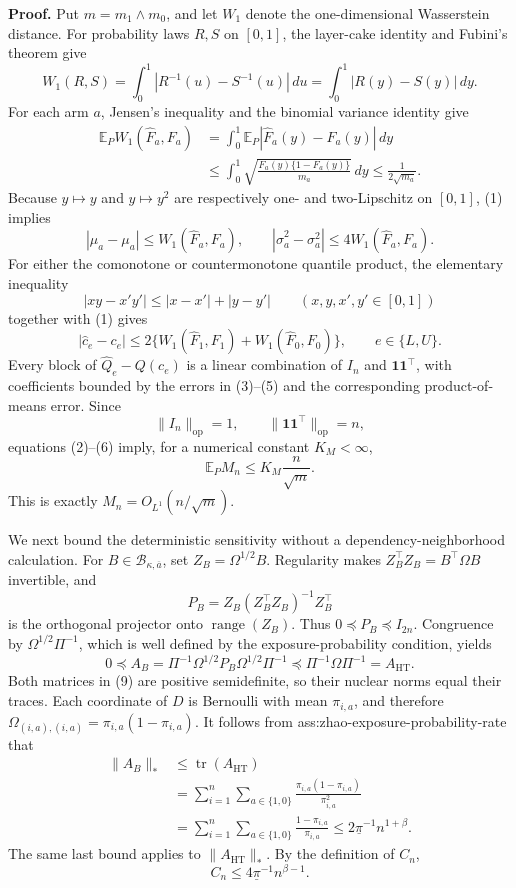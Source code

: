 \textbf{Proof.}
Put \(m=m_1\wedge m_0\), and let \(W_1\) denote the one-dimensional Wasserstein distance.  For probability laws \(R,S\) on \([0,1]\), the layer-cake identity and Fubini's theorem give
\[
W_1(R,S)
=\int_0^1|R^{-1}(u)-S^{-1}(u)|\,du
=\int_0^1|R(y)-S(y)|\,dy.
\tag{1}
\]
For each arm \(a\), Jensen's inequality and the binomial variance identity give
\[
\begin{aligned}
\mathbb E_PW_1(\widehat F_a,F_a)
&=\int_0^1\mathbb E_P|\widehat F_a(y)-F_a(y)|\,dy\\
&\le\int_0^1
\sqrt{\frac{F_a(y)\{1-F_a(y)\}}{m_a}}\,dy
\le\frac{1}{2\sqrt{m_a}}.
\end{aligned}
\tag{2}
\]
Because \(y\mapsto y\) and \(y\mapsto y^2\) are respectively one- and two-Lipschitz on \([0,1]\), (1) implies
\[
|\widehat\mu_a-\mu_a|
\le W_1(\widehat F_a,F_a),
\qquad
|\widehat\sigma_a^2-\sigma_a^2|
\le4W_1(\widehat F_a,F_a).
\tag{3}
\]
For either the comonotone or countermonotone quantile product, the elementary inequality
\[
|xy-x'y'|\le|x-x'|+|y-y'|
\qquad(x,y,x',y'\in[0,1])
\tag{4}
\]
together with (1) gives
\[
|\widehat c_e-c_e|
\le2\{W_1(\widehat F_1,F_1)+W_1(\widehat F_0,F_0)\},
\qquad e\in\{L,U\}.
\tag{5}
\]
Every block of \(\widehat Q_e-Q(c_e)\) is a linear combination of \(I_n\) and \(\mathbf1\mathbf1^{\top}\), with coefficients bounded by the errors in (3)--(5) and the corresponding product-of-means error.  Since
\[
\|I_n\|_{\mathrm{op}}=1,
\qquad
\|\mathbf1\mathbf1^{\top}\|_{\mathrm{op}}=n,
\tag{6}
\]
equations (2)--(6) imply, for a numerical constant \(K_M<\infty\),
\[
\mathbb E_PM_n
\le K_M\frac{n}{\sqrt m}.
\tag{7}
\]
This is exactly \(M_n=O_{L^1}(n/\sqrt m)\).

We next bound the deterministic sensitivity without a dependency-neighborhood calculation.  For \(B\in\mathcal B_{\kappa,\overline a}\), set \(Z_B=\Omega^{1/2}B\).  Regularity makes \(Z_B^{\top}Z_B=B^{\top}\Omega B\) invertible, and
\[
P_B=Z_B(Z_B^{\top}Z_B)^{-1}Z_B^{\top}
\tag{8}
\]
is the orthogonal projector onto \(\operatorname{range}(Z_B)\).  Thus \(0\preceq P_B\preceq I_{2n}\).  Congruence by \(\Omega^{1/2}\Pi^{-1}\), which is well defined by the exposure-probability condition, yields
\[
0\preceq
A_B=\Pi^{-1}\Omega^{1/2}P_B\Omega^{1/2}\Pi^{-1}
\preceq
\Pi^{-1}\Omega\Pi^{-1}=A_{\mathrm{HT}}.
\tag{9}
\]
Both matrices in (9) are positive semidefinite, so their nuclear norms equal their traces.  Each coordinate of \(D\) is Bernoulli with mean \(\pi_{i,a}\), and therefore \(\Omega_{(i,a),(i,a)}=\pi_{i,a}(1-\pi_{i,a})\).  It follows from ass:zhao-exposure-probability-rate that
\[
\begin{aligned}
\|A_B\|_*
&\le\operatorname{tr}(A_{\mathrm{HT}})\\
&=\sum_{i=1}^n\sum_{a\in\{1,0\}}
\frac{\pi_{i,a}(1-\pi_{i,a})}{\pi_{i,a}^2}\\
&=\sum_{i=1}^n\sum_{a\in\{1,0\}}
\frac{1-\pi_{i,a}}{\pi_{i,a}}
\le2\underline\pi^{-1}n^{1+\beta}.
\end{aligned}
\tag{10}
\]
The same last bound applies to \(\|A_{\mathrm{HT}}\|_*\).  By the definition of \(C_n\),
\[
C_n\le4\underline\pi^{-1}n^{\beta-1}.
\tag{11}
\]

